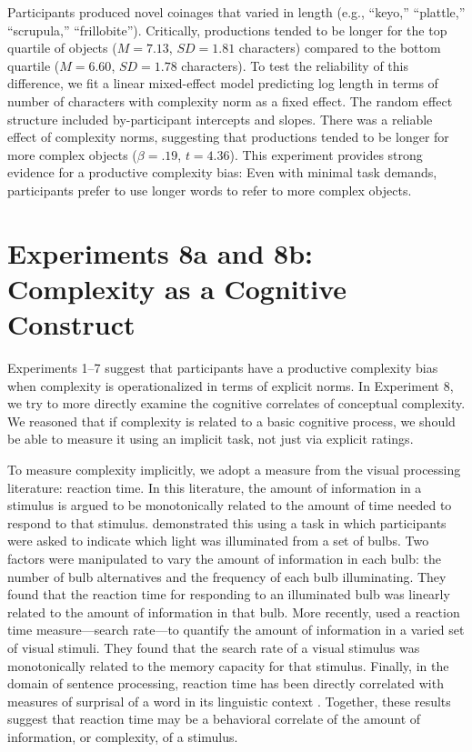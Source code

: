 \documentclass[man]{apa2}
\begin{document}
Participants produced novel coinages that varied in length (e.g., ``keyo,'' ``plattle,'' ``scrupula,'' ``frillobite''). Critically, productions tended to be longer for the top quartile of objects ($M = 7.13$, $SD = 1.81$ characters) compared to the bottom quartile ($M = 6.60$, $SD = 1.78$ characters). To test the reliability of this difference, we fit a linear mixed-effect model predicting log length in terms of number of characters with complexity norm as a fixed effect. The random effect structure included by-participant intercepts and slopes. There was a reliable effect of complexity norms, suggesting that productions tended to be longer for more complex objects ($\beta = .19$, $t = 4.36$). This experiment provides strong evidence for a productive complexity bias: Even with minimal task demands, participants prefer to use longer words to refer to more complex objects.

\section{Experiments 8a and 8b: Complexity as a Cognitive Construct}
Experiments 1--7 suggest that participants have a productive complexity bias when complexity is operationalized in terms of explicit norms. In Experiment 8, we try to more directly examine the cognitive correlates of conceptual complexity. We reasoned that if complexity is related to a basic cognitive process, we should be able to measure it using an implicit task, not just via explicit ratings.

To measure complexity implicitly, we adopt a measure from the visual processing literature: reaction time. In this literature, the amount of information in a stimulus is argued to be monotonically related to the amount of time needed to respond to that stimulus.  demonstrated this using a task in which participants were asked to indicate which light was illuminated from a set of bulbs. Two factors were manipulated to vary the amount of information in each bulb: the number of bulb alternatives and the frequency of each bulb illuminating. They found that the reaction time for responding to an illuminated bulb was linearly related to the amount of information in that bulb. More recently,  used a reaction time measure---search rate---to quantify the amount of information in a varied set of visual stimuli. They found that the search rate of a visual stimulus was monotonically related to the memory capacity for that stimulus. Finally, in the domain of sentence processing, reaction time has been directly correlated with measures of surprisal of a word in its linguistic context \cite{demberg2008data,levy2008expectation}. Together, these results suggest that reaction time may be a behavioral correlate of the amount of information, or complexity, of a stimulus.
\end{document}
